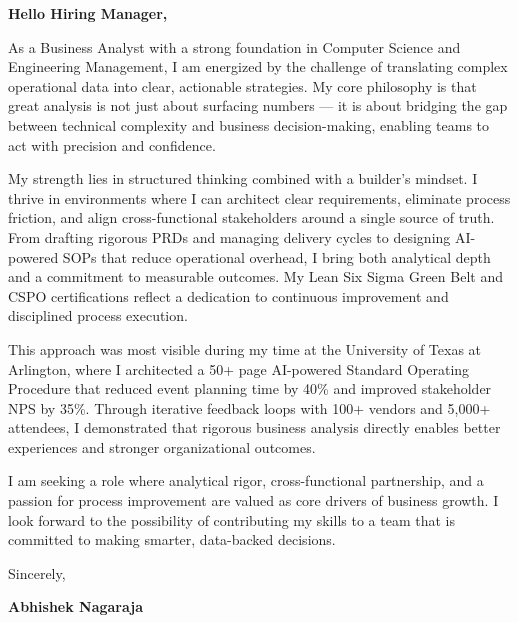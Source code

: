 \documentclass[11pt,letterpaper]{article} %
\begin{document}
\vspace{1.5em}

\textbf{Hello Hiring Manager,}

As a Business Analyst with a strong foundation in Computer Science and Engineering Management, I am energized by the challenge of translating complex operational data into clear, actionable strategies. My core philosophy is that great analysis is not just about surfacing numbers — it is about bridging the gap between technical complexity and business decision-making, enabling teams to act with precision and confidence.

My strength lies in structured thinking combined with a builder's mindset. I thrive in environments where I can architect clear requirements, eliminate process friction, and align cross-functional stakeholders around a single source of truth. From drafting rigorous PRDs and managing delivery cycles to designing AI-powered SOPs that reduce operational overhead, I bring both analytical depth and a commitment to measurable outcomes. My Lean Six Sigma Green Belt and CSPO certifications reflect a dedication to continuous improvement and disciplined process execution.

This approach was most visible during my time at the University of Texas at Arlington, where I architected a 50+ page AI-powered Standard Operating Procedure that reduced event planning time by 40\% and improved stakeholder NPS by 35\%. Through iterative feedback loops with 100+ vendors and 5,000+ attendees, I demonstrated that rigorous business analysis directly enables better experiences and stronger organizational outcomes.

I am seeking a role where analytical rigor, cross-functional partnership, and a passion for process improvement are valued as core drivers of business growth. I look forward to the possibility of contributing my skills to a team that is committed to making smarter, data-backed decisions.

\vspace{1.5em}
Sincerely,

\vspace{1.2em} %
\textbf{Abhishek Nagaraja}
\end{document}
